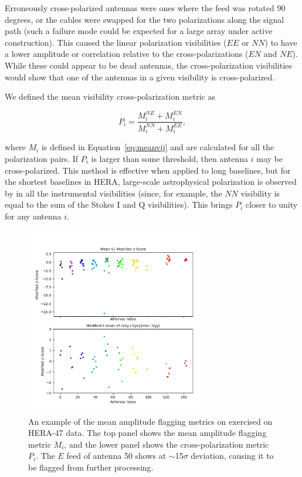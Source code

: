 Erroneously cross-polarized antennas were ones where the feed was rotated 90 degrees, or the
cables were swapped for the two polarizations along the signal path (such a failure mode
could be expected for a large array under active construction). This caused
the linear polarization visibilities ($EE$ or $NN$) to have a lower amplitude or
correlation relative to the cross-polarizations ($EN$ and $NE$). While these could appear to be dead antennas, 
the cross-polarization visibilities would show that one of the antennas in a given
visibility is cross-polarized.

We defined the mean visibility cross-polarization metric as 

\begin{equation}
P_{i} = \frac{M_{i}^{NE} + M_{i}^{EN}}{M_{i}^{NN} + M_{i}^{EE}},
\label{eq:meancrossvij}
\end{equation}

where $M_{i}$ is defined in Equation~\ref{eq:meanvij} and are calculated for
all the polarization pairs. If $P_{i}$ is larger than some threshold, then
antenna ${i}$ may be cross-polarized. This method is effective when applied
to long baselines, but for the shortest baselines in HERA, large-scale astrophysical polarization
\citep[e.g.][]{Lenc.16} is observed by in all the instrumental visibilities 
(since, for example, the $NN$ visibility is equal to the sum of the 
Stokes I and Q visibilities). This brings $P_{i}$ closer to unity
for any antenna $i$.

\begin{figure}
\centering
\includegraphics[width=0.7\textwidth]{chapters/data_processing/figures/metrics.png}
\caption[An example of the mean amplitude flagging metrics on exercised on HERA-47 data.]{An example of the mean amplitude flagging metrics on exercised on HERA-47 data. The top panel shows the mean amplitude flagging metric $M_i$, and the lower panel shows the cross-polarization metric $P_i$. The $E$ feed of antenna 50 shows at $\sim$15$\sigma$ deviation, causing it to be flagged from further processing.}
\label{fig:data_metrics}
\end{figure}

